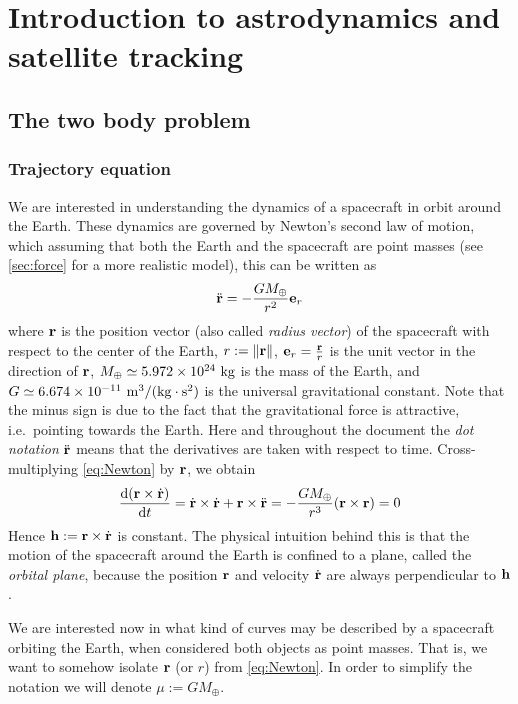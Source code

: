 \documentclass[../main.tex]{subfiles}
\begin{document}
\section{Introduction to astrodynamics and satellite tracking}
\subsection{The two body problem}\label{sec:twoBody}
\subsubsection{Trajectory equation}
We are interested in understanding the dynamics of a spacecraft in orbit around the Earth. These dynamics are governed by Newton's second law of motion, which assuming that both the Earth and the spacecraft are point masses (see \cref{sec:force} for a more realistic model), this can be written as
\begin{equation}
  \label{eq:Newton}
  \ddot{\boldsymbol{\mathrm{r}}}=-\frac{GM_{\oplus}}{r^2}\boldsymbol{\mathrm{e}}_r
\end{equation}
where $\boldsymbol{\mathrm{r}}$ is the position vector (also called \emph{radius vector}) of the spacecraft with respect to the center of the Earth, $r:=\left\|\boldsymbol{\mathrm{r}}\right\|$, $\boldsymbol{\mathrm{e}}_r=\frac{\boldsymbol{\mathrm{r}}}{r}$ is the unit vector in the direction of $\boldsymbol{\mathrm{r}}$, $M_{\oplus}\simeq 5.972\times 10^{24}\ \kg$ is the mass of the Earth, and $G\simeq 6.674\times 10^{-11}\ \mathrm{m}^3/ (\mathrm{kg}\cdot\mathrm{s}^2)$ is the universal gravitational constant. Note that the minus sign is due to the fact that the gravitational force is attractive, i.e.\ pointing towards the Earth.
Here and throughout the document the \emph{dot notation} $\ddot{\boldsymbol{\mathrm{r}}}$ means that the derivatives are taken with respect to time.
Cross-multiplying \cref{eq:Newton} by $\boldsymbol{\mathrm{r}}$, we obtain
\begin{equation}
  \dv{(\boldsymbol{\mathrm{r}}\times \dot{\boldsymbol{\mathrm{r}}})}{t}=\dot{\boldsymbol{\mathrm{r}}}\times \dot{\boldsymbol{\mathrm{r}}}+\boldsymbol{\mathrm{r}}\times\ddot{\boldsymbol{\mathrm{r}}}=-\frac{GM_{\oplus}}{r^3}(\boldsymbol{\mathrm{r}}\times \boldsymbol{\mathrm{r}})=0
\end{equation}
Hence $\boldsymbol{\mathrm{h}}:=\boldsymbol{\mathrm{r}}\times \dot{\boldsymbol{\mathrm{r}}}$ is constant. The physical intuition behind this is that the motion of the spacecraft around the Earth is confined to a plane, called the \emph{orbital plane}, because the position $\boldsymbol{\mathrm{r}}$ and velocity $\dot{\boldsymbol{\mathrm{r}}}$ are always perpendicular to $\boldsymbol{\mathrm{h}}$.

We are interested now in what kind of curves may be described by a spacecraft orbiting the Earth, when considered both objects as point masses. That is, we want to somehow isolate $\boldsymbol{\mathrm{r}}$ (or $r$) from \cref{eq:Newton}. In order to simplify the notation we will denote $\mu:=GM_{\oplus}$.
\end{document}
